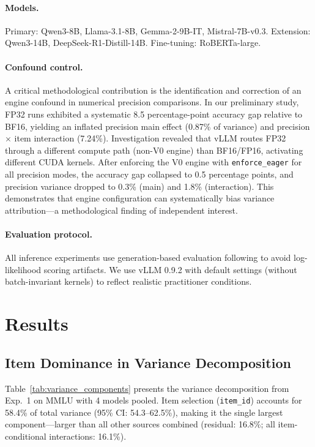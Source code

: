 \documentclass[letterpaper,11pt]{article}
\begin{document}
\paragraph{Models.}
Primary: Qwen3-8B, Llama-3.1-8B, Gemma-2-9B-IT, Mistral-7B-v0.3.
Extension: Qwen3-14B, DeepSeek-R1-Distill-14B.
Fine-tuning: RoBERTa-large.

\paragraph{Confound control.}
A critical methodological contribution is the identification and correction of an engine confound in numerical precision comparisons.
In our preliminary study, FP32 runs exhibited a systematic 8.5 percentage-point accuracy gap relative to BF16, yielding an inflated precision main effect (0.87\% of variance) and precision $\times$ item interaction (7.24\%).
Investigation revealed that vLLM routes FP32 through a different compute path (non-V0 engine) than BF16/FP16, activating different CUDA kernels.
After enforcing the V0 engine with \texttt{enforce\_eager} for all precision modes, the accuracy gap collapsed to 0.5 percentage points, and precision variance dropped to 0.3\% (main) and 1.8\% (interaction).
This demonstrates that engine configuration can systematically bias variance attribution---a methodological finding of independent interest.

\paragraph{Evaluation protocol.}
All inference experiments use generation-based evaluation following \citet{hua2025} to avoid log-likelihood scoring artifacts.
We use vLLM 0.9.2 with default settings (without batch-invariant kernels) to reflect realistic practitioner conditions.

\section{Results}

\subsection{Item Dominance in Variance Decomposition}

Table~\ref{tab:variance_components} presents the variance decomposition from Exp.~1 on MMLU with 4 models pooled.
Item selection (\texttt{item\_id}) accounts for 58.4\% of total variance (95\% CI: 54.3--62.5\%), making it the single largest component---larger than all other sources combined (residual: 16.8\%; all item-conditional interactions: 16.1\%).
\end{document}
